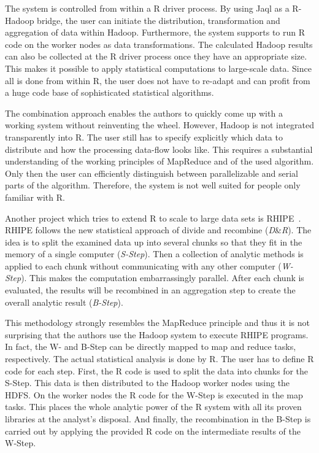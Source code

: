 The system is controlled from within a R driver process.
By using Jaql as a R-Hadoop bridge, the user can initiate the distribution, transformation and aggregation of data within Hadoop.
Furthermore, the system supports to run R code on the worker nodes as data transformations.
The calculated Hadoop results can also be collected at the R driver process once they have an appropriate size.
This makes it possible to apply statistical computations to large-scale data.
Since all is done from within R, the user does not have to re-adapt and can profit from a huge code base of sophisticated statistical algorithms.

The combination approach enables the authors to quickly come up with a working system without reinventing the wheel.
However, Hadoop is not integrated transparently into R.
The user still has to specify explicitly which data to distribute and how the processing data-flow looks like.
This requires a substantial understanding of the working principles of MapReduce and of the used algorithm.
Only then the user can efficiently distinguish between parallelizable and serial parts of the algorithm.
Therefore, the system is not well suited for people only familiar with R.

Another project which tries to extend R to scale to large data sets is RHIPE~\cite{guha:s2012a}.
RHIPE follows the new statistical approach of divide and recombine (\emph{D}\&\emph{R}).
The idea is to split the examined data up into several chunks so that they fit in the memory of a single computer (\emph{S-Step}).
Then a collection of analytic methods is applied to each chunk without communicating with any other computer (\emph{W-Step}).
This makes the computation embarrassingly parallel.
After each chunk is evaluated, the results will be recombined in an aggregation step to create the overall analytic result (\emph{B-Step}).

This methodology strongly resembles the MapReduce principle and thus it is not surprising that the authors use the Hadoop system to execute RHIPE programs.
In fact, the W- and B-Step can be directly mapped to map and reduce tasks, respectively.
The actual statistical analysis is done by R.
The user has to define R code for each step.
First, the R code is used to split the data into chunks for the S-Step.
This data is then distributed to the Hadoop worker nodes using the HDFS.
On the worker nodes the R code for the W-Step is executed in the map tasks.
This places the whole analytic power of the R system with all its proven libraries at the analyst's disposal.
And finally, the recombination in the B-Step is carried out by applying the provided R code on the intermediate results of the W-Step.

